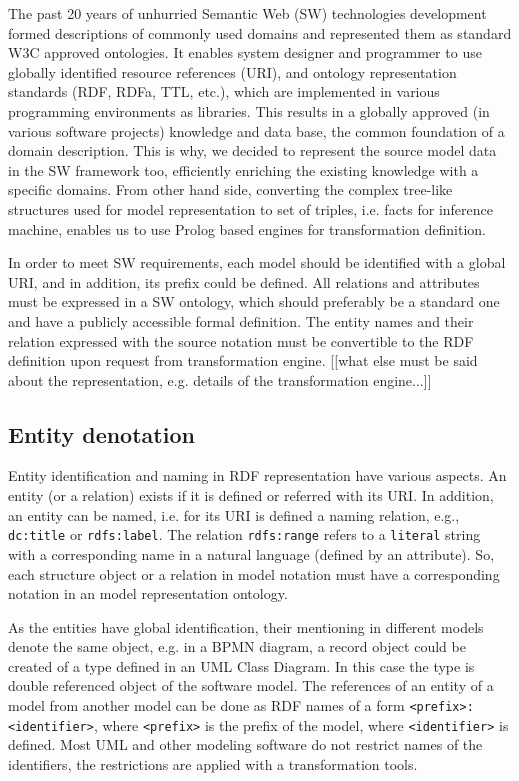 \documentclass[conference]{IEEEtran}
\begin{document}
The past 20 years of unhurried Semantic Web (SW) technologies development formed descriptions of commonly used domains and represented them as standard W3C approved ontologies.  It enables system designer and programmer to use globally identified resource references (URI), and ontology representation standards (RDF, RDFa, TTL, etc.), which are implemented in various programming environments as libraries.  This results in a globally approved (in various software projects) knowledge and data base, the common foundation of a domain description.  This is why, we decided to represent the source model data in the SW framework too, efficiently enriching the existing knowledge with a specific domains.  From other hand side, converting the complex tree-like structures used for model representation to set of triples, i.e. facts for inference machine, enables us to use Prolog based engines for transformation definition.

In order to meet SW requirements, each model should be identified with a global URI, and in addition, its prefix could be defined.  All relations and attributes must be expressed in a SW ontology, which should preferably be a standard one and have a publicly accessible formal definition.  The entity names and their relation expressed with the source notation must be convertible to the RDF definition upon request from transformation engine.  [[what else must be said about the representation, e.g. details of the transformation engine...]]

\subsection{Entity denotation}
\label{sec:ent-def}

Entity identification and naming in RDF representation have various aspects.  An entity (or a relation) exists if it is defined or referred with its URI.  In addition, an entity can be named,  i.e. for its URI is defined a naming relation, e.g., \texttt{dc:title} or \texttt{rdfs:label}.  The relation \texttt{rdfs:range} refers to a \texttt{literal} string with a corresponding name in a natural language (defined by an attribute).  So, each structure object or a relation in model notation must have a corresponding notation in an model representation ontology.

As the entities have global identification, their mentioning in different models denote the same object, e.g. in a BPMN diagram, a record object could be created of a type defined in an UML Class Diagram.  In this case the type is double referenced object of the software model.  The references of an entity of a model from another model can be done as RDF names of a form \texttt{<prefix>:<identifier>}, where \texttt{<prefix>} is the prefix of the model, where \texttt{<identifier>} is defined.  Most UML and other modeling software do not restrict names of the identifiers, the restrictions are applied with a transformation tools.
\end{document}
